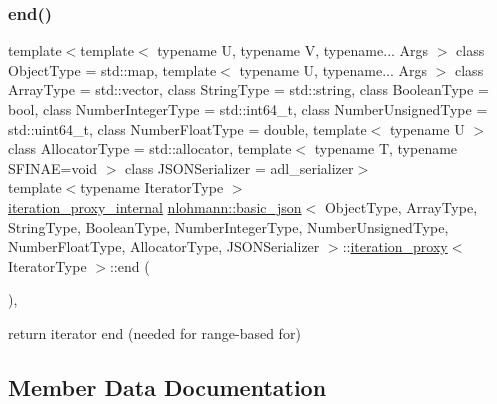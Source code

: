 \subsubsection{\texorpdfstring{end()}{end()}}
{\footnotesize\ttfamily template$<$template$<$ typename U, typename V, typename... Args $>$ class Object\+Type = std\+::map, template$<$ typename U, typename... Args $>$ class Array\+Type = std\+::vector, class String\+Type  = std\+::string, class Boolean\+Type  = bool, class Number\+Integer\+Type  = std\+::int64\+\_\+t, class Number\+Unsigned\+Type  = std\+::uint64\+\_\+t, class Number\+Float\+Type  = double, template$<$ typename U $>$ class Allocator\+Type = std\+::allocator, template$<$ typename T, typename S\+F\+I\+N\+A\+E=void $>$ class J\+S\+O\+N\+Serializer = adl\+\_\+serializer$>$ \\
template$<$typename Iterator\+Type $>$ \\
\hyperlink{classnlohmann_1_1basic__json_1_1iteration__proxy_1_1iteration__proxy__internal}{iteration\+\_\+proxy\+\_\+internal} \hyperlink{classnlohmann_1_1basic__json}{nlohmann\+::basic\+\_\+json}$<$ Object\+Type, Array\+Type, String\+Type, Boolean\+Type, Number\+Integer\+Type, Number\+Unsigned\+Type, Number\+Float\+Type, Allocator\+Type, J\+S\+O\+N\+Serializer $>$\+::\hyperlink{classnlohmann_1_1basic__json_1_1iteration__proxy}{iteration\+\_\+proxy}$<$ Iterator\+Type $>$\+::end (\begin{DoxyParamCaption}{ }\end{DoxyParamCaption})\hspace{0.3cm}{\ttfamily [inline]}, {\ttfamily [noexcept]}}



return iterator end (needed for range-\/based for) 



\subsection{Member Data Documentation}
\mbox{\label{classnlohmann_1_1basic__json_1_1iteration__proxy_acedcb3422746ac0672d359407a1be56c}} 

